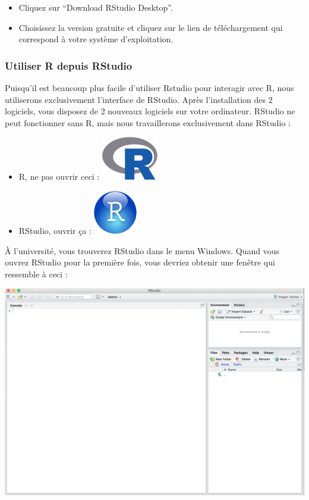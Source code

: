 \documentclass[
  a4paper,
]{article}
\providecommand{\tightlist}{%
  \setlength{\itemsep}{0pt}\setlength{\parskip}{0pt}}
\begin{document}
\begin{itemize}
\tightlist
\item
  Cliquez sur ``Download RStudio Desktop''.
\item
  Choisissez la version gratuite et cliquez sur le lien de téléchargement qui correspond à votre système d'exploitation.
\end{itemize}

\hypertarget{utiliser-r-depuis-rstudio}{%
\subsubsection{Utiliser R depuis RStudio}\label{utiliser-r-depuis-rstudio}}

Puisqu'il est beaucoup plus facile d'utiliser Rstudio pour interagir avec R, nous utiliserons exclusivement l'interface de RStudio. Après l'installation des 2 logiciels, vous disposez de 2 nouveaux logiciels sur votre ordinateur. RStudio ne peut fonctionner sans R, mais nous travaillerons exclusivement dans RStudio :

\begin{itemize}
\tightlist
\item
  R, ne pas ouvrir ceci : \includegraphics{images/Rlogo.png}
\item
  RStudio, ouvrir ça : \includegraphics{images/RStudio-Ball.png}
\end{itemize}

À l'université, vous trouverez RStudio dans le menu Windows. Quand vous ouvrez RStudio pour la première fois, vous devriez obtenir une fenêtre qui ressemble à ceci :

\includegraphics{images/rstudio.png}
\end{document}

